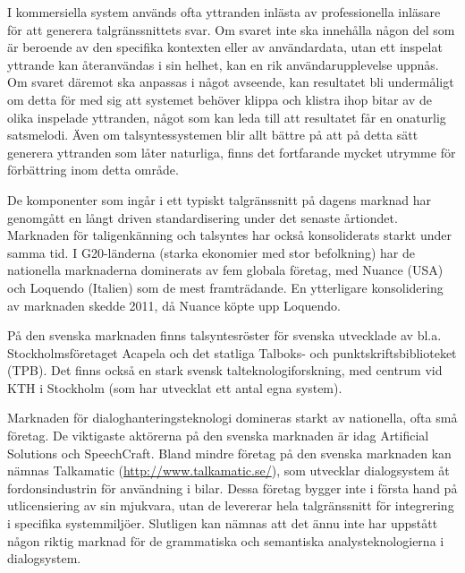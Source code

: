 \begin{multicols}{2}

I kommersiella system används ofta yttranden inlästa av professionella
inläsare för att generera talgränssnittets svar. Om svaret inte ska
innehålla någon del som är beroende av den specifika kontexten eller
av användardata, utan ett inspelat yttrande kan återanvändas i sin
helhet, kan en rik användarupplevelse uppnås. Om svaret däremot ska
anpassas i något avseende, kan resultatet bli undermåligt om detta för
med sig att systemet behöver klippa och klistra ihop bitar av de olika
inspelade yttranden, något som kan leda till att resultatet får en
onaturlig satsmelodi. Även om talsyntessystemen blir allt bättre på
att på detta sätt generera yttranden som låter naturliga, finns det
fortfarande mycket utrymme för förbättring inom detta område.

De komponenter som ingår i ett typiskt talgränssnitt på dagens marknad
har genomgått en långt driven standardisering under det senaste
årtiondet. Marknaden för taligenkänning och talsyntes har också
konsoliderats starkt under samma tid. I G20-länderna (starka ekonomier
med stor befolkning) har de nationella marknaderna dominerats av fem
globala företag, med Nuance (USA) och Loquendo (Italien) som de mest
framträdande. En ytterligare konsolidering av marknaden skedde 2011,
då Nuance köpte upp Loquendo.

På den svenska marknaden finns talsyntesröster för svenska utvecklade
av bl.a. Stockholmsföretaget Acapela och det statliga Talboks- och
punktskriftsbiblioteket (TPB). Det finns också en stark svensk
tal\-tekno\-logi\-forsk\-ning, med centrum vid KTH i Stockholm (som
har utvecklat ett antal egna system).

Marknaden för dialoghanteringsteknologi domineras starkt av
nationella, ofta små företag. De viktigaste aktörerna på den svenska
marknaden är idag Artificial Solutions och SpeechCraft. Bland mindre
företag på den svenska marknaden kan nämnas
Talkamatic (\url{http://www.talkamatic.se/}), som utvecklar
dialogsystem åt fordonsindustrin för användning i bilar. Dessa företag
bygger inte i första hand på utlicensiering av sin mjukvara, utan de
levererar hela talgränssnitt för integrering i specifika
systemmiljöer. Slutligen kan nämnas att det ännu inte har uppstått
någon riktig marknad för de grammatiska och semantiska
analysteknologierna i dialogsystem.


\end{multicols}
